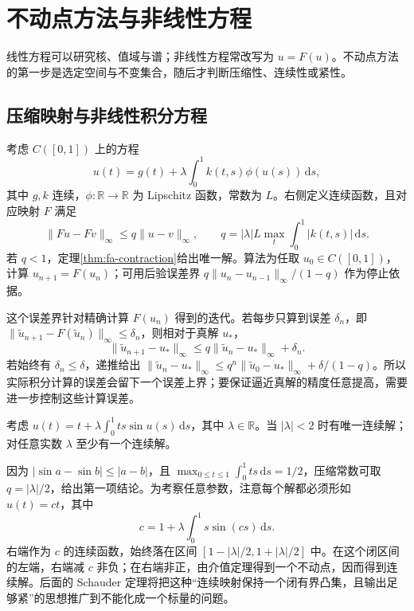 \documentclass[UTF8,12pt,a4paper,fontset=fandol]{ctexbook}
\begin{document}
\chapter{不动点方法与非线性方程}
\label{chap:fa-fixed-point}

线性方程可以研究核、值域与谱；非线性方程常改写为 $u=F(u)$。不动点方法的第一步是选定空间与不变集合，随后才判断压缩性、连续性或紧性。

\section{压缩映射与非线性积分方程}
考虑 $C([0,1])$ 上的方程
\[
 u(t)=g(t)+\lambda\int_0^1k(t,s)\phi(u(s))\,\mathrm ds,
\]
其中 $g,k$ 连续，$\phi:\mathbb R\to\mathbb R$ 为 Lipschitz 函数，常数为 $L$。右侧定义连续函数，且对应映射 $F$ 满足
\[
 \|Fu-Fv\|_\infty\leq q\|u-v\|_\infty,
 \qquad q=|\lambda|L\max_t\int_0^1|k(t,s)|\,\mathrm ds.
\]
若 $q<1$，定理\ref{thm:fa-contraction}给出唯一解。算法为任取 $u_0\in C([0,1])$，计算 $u_{n+1}=F(u_n)$；可用后验误差界 $q\|u_n-u_{n-1}\|_\infty/(1-q)$ 作为停止依据。

这个误差界针对精确计算 $F(u_n)$ 得到的迭代。若每步只算到误差 $\delta_n$，即 $\|\widetilde u_{n+1}-F(\widetilde u_n)\|_\infty\leq\delta_n$，则相对于真解 $u_*$，
\[
 \|\widetilde u_{n+1}-u_*\|_\infty
 \leq q\|\widetilde u_n-u_*\|_\infty+\delta_n.
\]
若始终有 $\delta_n\leq\delta$，递推给出 $\|\widetilde u_n-u_*\|_\infty\leq q^n\|\widetilde u_0-u_*\|_\infty+\delta/(1-q)$。所以实际积分计算的误差会留下一个误差上界；要保证逼近真解的精度任意提高，需要进一步控制这些计算误差。

\begin{example}[一个既能用压缩性又能用紧性的方程]\label{ex:fa-nonlinear-integral}
考虑 $u(t)=t+\lambda\int_0^1ts\sin u(s)\,\mathrm ds$，其中 $\lambda\in\mathbb R$。当 $|\lambda|<2$ 时有唯一连续解；对任意实数 $\lambda$ 至少有一个连续解。
\end{example}
\begin{solve}
因为 $|\sin a-\sin b|\leq|a-b|$，且 $\max_{0\leq t\leq1}\int_0^1ts\,\mathrm ds=1/2$，压缩常数可取 $q=|\lambda|/2$，给出第一项结论。为考察任意参数，注意每个解都必须形如 $u(t)=ct$，其中
\[
 c=1+\lambda\int_0^1s\sin(cs)\,\mathrm ds.
\]
右端作为 $c$ 的连续函数，始终落在区间 $[1-|\lambda|/2,1+|\lambda|/2]$ 中。在这个闭区间的左端，右端减 $c$ 非负；在右端非正，由介值定理得到一个不动点，因而得到连续解。后面的 Schauder 定理将把这种“连续映射保持一个闭有界凸集，且输出足够紧”的思想推广到不能化成一个标量的问题。
\end{solve}
\end{document}
